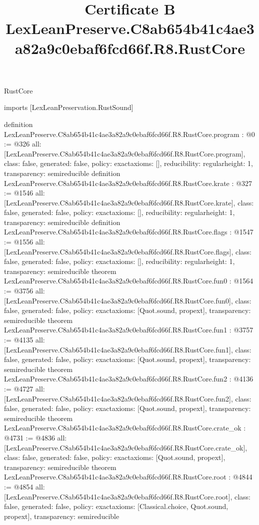 \begin{lexlean}{RustCore}
\title{Certificate B LexLeanPreserve.C8ab654b41c4ae3a82a9c0ebaf6fcd66f.R8.RustCore}
\begin{coremodule}
imports [LexLeanPreservation.RustSound]

definition LexLeanPreserve.C8ab654b41c4ae3a82a9c0ebaf6fcd66f.R8.RustCore.program : @0 := @326 {
  all: [LexLeanPreserve.C8ab654b41c4ae3a82a9c0ebaf6fcd66f.R8.RustCore.program],
  class: false,
  generated: false,
  policy: exact{axioms: []},
  reducibility: regular{height: 1},
  transparency: semireducible
}
definition LexLeanPreserve.C8ab654b41c4ae3a82a9c0ebaf6fcd66f.R8.RustCore.krate : @327 := @1546 {
  all: [LexLeanPreserve.C8ab654b41c4ae3a82a9c0ebaf6fcd66f.R8.RustCore.krate],
  class: false,
  generated: false,
  policy: exact{axioms: []},
  reducibility: regular{height: 1},
  transparency: semireducible
}
definition LexLeanPreserve.C8ab654b41c4ae3a82a9c0ebaf6fcd66f.R8.RustCore.flags : @1547 := @1556 {
  all: [LexLeanPreserve.C8ab654b41c4ae3a82a9c0ebaf6fcd66f.R8.RustCore.flags],
  class: false,
  generated: false,
  policy: exact{axioms: []},
  reducibility: regular{height: 1},
  transparency: semireducible
}
theorem LexLeanPreserve.C8ab654b41c4ae3a82a9c0ebaf6fcd66f.R8.RustCore.fun0 : @1564 := @3756 {
  all: [LexLeanPreserve.C8ab654b41c4ae3a82a9c0ebaf6fcd66f.R8.RustCore.fun0],
  class: false,
  generated: false,
  policy: exact{axioms: [Quot.sound, propext]},
  transparency: semireducible
}
theorem LexLeanPreserve.C8ab654b41c4ae3a82a9c0ebaf6fcd66f.R8.RustCore.fun1 : @3757 := @4135 {
  all: [LexLeanPreserve.C8ab654b41c4ae3a82a9c0ebaf6fcd66f.R8.RustCore.fun1],
  class: false,
  generated: false,
  policy: exact{axioms: [Quot.sound, propext]},
  transparency: semireducible
}
theorem LexLeanPreserve.C8ab654b41c4ae3a82a9c0ebaf6fcd66f.R8.RustCore.fun2 : @4136 := @4727 {
  all: [LexLeanPreserve.C8ab654b41c4ae3a82a9c0ebaf6fcd66f.R8.RustCore.fun2],
  class: false,
  generated: false,
  policy: exact{axioms: [Quot.sound, propext]},
  transparency: semireducible
}
theorem LexLeanPreserve.C8ab654b41c4ae3a82a9c0ebaf6fcd66f.R8.RustCore.crate_ok : @4731 := @4836 {
  all: [LexLeanPreserve.C8ab654b41c4ae3a82a9c0ebaf6fcd66f.R8.RustCore.crate_ok],
  class: false,
  generated: false,
  policy: exact{axioms: [Quot.sound, propext]},
  transparency: semireducible
}
theorem LexLeanPreserve.C8ab654b41c4ae3a82a9c0ebaf6fcd66f.R8.RustCore.root : @4844 := @4854 {
  all: [LexLeanPreserve.C8ab654b41c4ae3a82a9c0ebaf6fcd66f.R8.RustCore.root],
  class: false,
  generated: false,
  policy: exact{axioms: [Classical.choice, Quot.sound, propext]},
  transparency: semireducible
}


\end{coremodule}
\end{lexlean}
